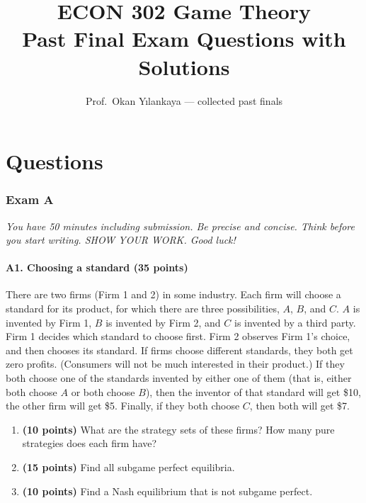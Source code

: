 \documentclass[11pt]{article}
\title{ECON 302 Game Theory\\[4pt] \large Past Final Exam Questions with Solutions}
\author{Prof.\ Okan Y\i lankaya --- collected past finals}
\date{}
\newcommand{\pts}[1]{\textbf{(#1 points)}}
\begin{document}
\maketitle
\tableofcontents
\newpage

\part*{Questions}

\section*{Exam A}
\textit{You have 50 minutes including submission. Be precise and concise. Think before you start writing. SHOW YOUR WORK. Good luck!}

\subsection*{A1. Choosing a standard \pts{35}}
There are two firms (Firm 1 and 2) in some industry. Each firm will choose a standard for its product, for which there are three possibilities, $A$, $B$, and $C$. $A$ is invented by Firm 1, $B$ is invented by Firm 2, and $C$ is invented by a third party. Firm 1 decides which standard to choose first. Firm 2 observes Firm 1's choice, and then chooses its standard. If firms choose different standards, they both get zero profits. (Consumers will not be much interested in their product.) If they both choose one of the standards invented by either one of them (that is, either both choose $A$ or both choose $B$), then the inventor of that standard will get \$10, the other firm will get \$5. Finally, if they both choose $C$, then both will get \$7.
\begin{enumerate}
  \item[(a)] \pts{10} What are the strategy sets of these firms? How many pure strategies does each firm have?
  \item[(b)] \pts{15} Find all subgame perfect equilibria.
  \item[(c)] \pts{10} Find a Nash equilibrium that is not subgame perfect.
\end{enumerate}
\end{document}
